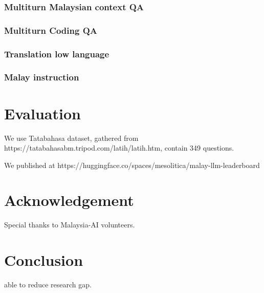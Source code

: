 \documentclass{article}
\begin{document}
\subsubsection{Multiturn Malaysian context QA}

\subsubsection{Multiturn Coding QA}

\subsubsection{Translation low language}

\subsubsection{Malay instruction}

\section{Evaluation}

We use Tatabahasa dataset, gathered from https://tatabahasabm.tripod.com/latih/latih.htm, contain 349 questions.

We published at https://huggingface.co/spaces/mesolitica/malay-llm-leaderboard

\section{Acknowledgement}

Special thanks to Malaysia-AI volunteers.

\section{Conclusion}

able to reduce research gap.

{}

\end{document}

